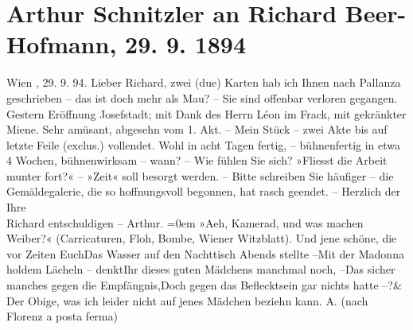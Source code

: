 \documentclass{book}
\newcommand{\stanzaend}{\&}
\begin{document}
\tableofcontents

   \section {Arthur Schnitzler an Richard Beer-Hofmann, 29. 9. 1894}  \beginnumbering
            \pstart
           Wien  , 29. 9. 94.\pend
           \pstart
           Lieber Richard, {zwei} (due) Karten hab ich Ihnen nach Pallanza geschrieben – das ist doch mehr als Mau? – Sie sind
               offenbar verloren gegangen.\pend
                        \pstart
           Gestern Eröffnung Josefstadt; mit Dank des Herrn Léon   im Frack, mit gekränkter Miene. Sehr amüsant,
               abgesehn vom 1. Akt. –\pend
           \pstart
           Mein Stück – zwei Akte bis auf
               letzte Feile (exclus.) vollendet. Wohl in acht Tagen fertig, – bühnenfertig in etwa
               4 Wochen, bühnenwirksam – wann? –\pend
           \pstart
           Wie fühlen Sie sich? »Fliesst die Arbeit munter fort?« –\pend
           \pstart
           »Zeit«
               soll besorgt werden. – Bitte schreiben Sie häufiger – die Gemäldegalerie, die so
               hoffnungsvoll begonnen, hat rasch geendet. –\pend
           \pstart
           Herzlich der Ihre{\\[\baselineskip]}  {{Richard} entschuldigen – Arthur.}\pend
           \leftskip=0em{}\pstart
           »Aeh, Kamerad, und was machen Weiber?« (Carricaturen, Floh, Bombe, Wiener
                  Witzblatt).\pend
           \stanza{}Und jene schöne, die vor Zeiten Euch\newverse{}Das Wasser auf den Nachttisch Abends stellte –\newverse{}Mit der Madonna holdem Lächeln – denkt\newverse{}Ihr dieses guten Mädchens manchmal noch, –\newverse{}Das sicher manches gegen die Empfängnis,\newverse{}Doch gegen das Beflecktsein gar nichts hatte –?\stanzaend{}\pstart
           Der Obige, was ich leider nicht auf jenes Mädchen beziehn kann.\pend
           \pstart
             {A.}\pend
           \pstart
           (nach Florenz  a posta ferma)\pend
           \endnumbering
\end{document}
